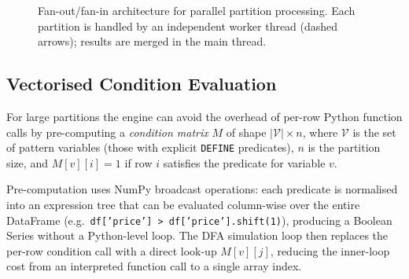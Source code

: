 \begin{figure}[htbp]
  \centering
  \caption{Fan-out/fan-in architecture for parallel partition
    processing.  Each partition is handled by an independent worker
    thread (dashed arrows); results are merged in the main thread.}
  \label{fig:parallel-partitions}
\end{figure}

\subsection{Vectorised Condition Evaluation}
\label{subsec:bg-vectorised}

For large partitions the engine can avoid the overhead of
per-row Python function calls by pre-computing a
\emph{condition matrix} $M$ of shape
$|\mathcal{V}| \times n$, where $\mathcal{V}$ is the set of
pattern variables (those with explicit \texttt{DEFINE} predicates),
$n$ is the partition size, and $M[v][i] = 1$ if row $i$ satisfies
the predicate for variable $v$.

Pre-computation uses NumPy broadcast operations: each predicate is
normalised into an expression tree that can be evaluated
column-wise over the entire DataFrame (e.g.\
\texttt{df['price'] > df['price'].shift(1)}), producing a
Boolean Series without a Python-level loop.  The DFA simulation
loop then replaces the per-row condition call with a direct look-up
$M[v][j]$, reducing the inner-loop cost from an interpreted
function call to a single array index.

